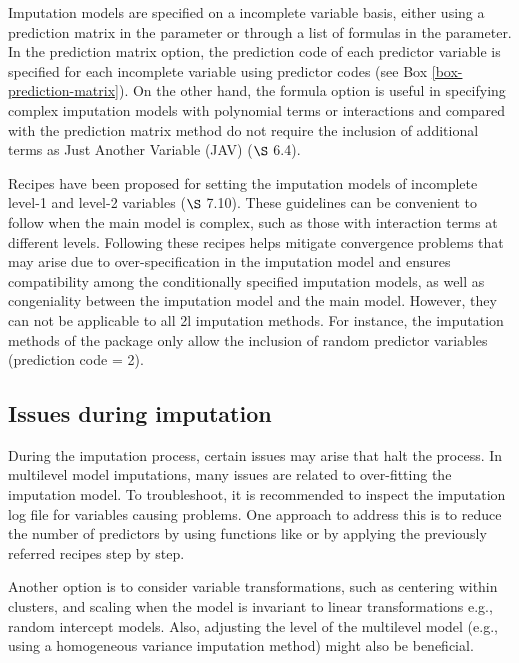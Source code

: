 \documentclass[
  article]{jss}
\begin{document}
Imputation models are specified on a incomplete variable basis, either
using a prediction matrix in the  parameter or through a list
of formulas in the  parameter. In the prediction matrix
option, the prediction code of each predictor variable is specified for
each incomplete variable using predictor codes (see Box
\ref{box-prediction-matrix}). On the other hand, the formula option is
useful in specifying complex imputation models with polynomial terms or
interactions and compared with the prediction matrix method do not
require the inclusion of additional terms as Just Another Variable (JAV)
\citep{buur18} (\(\S\) 6.4).

Recipes have been proposed for setting the imputation models of
incomplete level-1 and level-2 variables \citep{buur18} (\(\S\) 7.10).
These guidelines can be convenient to follow when the main model is
complex, such as those with interaction terms at different levels.
Following these recipes helps mitigate convergence problems that may
arise due to over-specification in the imputation model and ensures
compatibility among the conditionally specified imputation models, as
well as congeniality between the imputation model and the main model.
However, they can not be applicable to all 2l imputation methods. For
instance, the  imputation methods of the 
package only allow the inclusion of random predictor variables
(prediction code = 2).

\subsection{Issues during imputation}\label{issues-during-imputation}

During the imputation process, certain issues may arise that halt the
process. In multilevel model imputations, many issues are related to
over-fitting the imputation model. To troubleshoot, it is recommended to
inspect the imputation log file for variables causing problems. One
approach to address this is to reduce the number of predictors by using
functions like  or by applying the previously referred
recipes step by step.

Another option is to consider variable transformations, such as
centering within clusters, and scaling when the model is invariant to
linear transformations e.g., random intercept models. Also, adjusting
the level of the multilevel model (e.g., using a homogeneous variance
imputation method) might also be beneficial.
\end{document}
